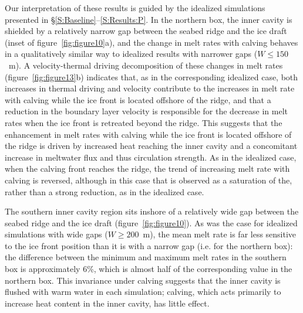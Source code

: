 \documentclass[draft]{agujournal2019}
\begin{document}
Our interpretation of these results is guided by the idealized simulations presented in \S\ref{S:Baseline}--\ref{S:Results:P}. In the northern box, the inner cavity is shielded by a relatively narrow gap between the seabed ridge and the ice draft (inset of figure~\ref{fig:figure10}a), and the change in melt rates with calving behaves in a qualitatively similar way to idealized results with narrower gaps ($W\leq150$~m). A velocity-thermal driving decomposition of these changes in melt rates (figure~\ref{fig:figure13}b) indicates that, as in the corresponding idealized case, both increases in thermal driving and velocity contribute to the increases in melt rate with calving while the ice front is located offshore of the ridge, and that a reduction in the boundary layer velocity is responsible for the decrease in melt rates when the ice front is retreated beyond the ridge. This suggests that the enhancement in melt rates with calving while the ice front is located offshore of the ridge is driven by increased heat reaching the inner cavity and a concomitant increase in meltwater flux and thus circulation strength. As in the idealized case, when the calving front reaches the ridge, the trend of increasing melt rate with calving is reversed, although in this case that is observed as a saturation of the, rather than a strong reduction, as in the idealized case.


The southern inner cavity region sits inshore of a relatively wide gap between the seabed ridge and the ice draft (figure~\ref{fig:figure10}). As was the case for idealized simulations with wide gaps ($W\geq200$~m), the mean melt rate is far less sensitive to the ice front position than it is with a narrow gap (i.e. for the northern box): the difference between the minimum and maximum melt rates in the southern box is approximately 6\%, which is almost half of the corresponding value in the northern box. This invariance under calving suggests that the inner cavity is flushed with warm water in each simulation; calving, which acts primarily to increase heat content in the inner cavity, has little effect.
\end{document}
